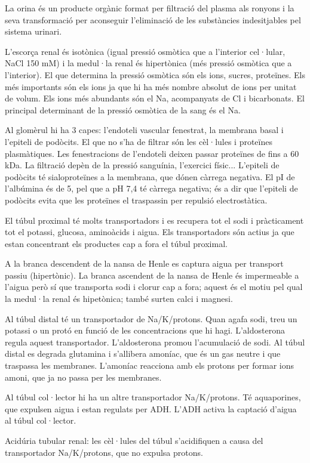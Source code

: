 La orina és un producte orgànic format per filtració del plasma als ronyons i la seva transformació per aconseguir l'eliminació de les substàncies indesitjables pel sistema urinari.


L'escorça renal és isotònica (igual pressió osmòtica que a l'interior cel·lular, NaCl 150 mM) i la medul·la renal és hipertònica (més pressió osmòtica que a l'interior). El que determina la pressió osmòtica són els ions, sucres, proteïnes. Els més importants són els ions ja que hi ha més nombre absolut de ions per unitat de volum. Els ions més abundants són el Na, acompanyats de Cl i bicarbonats. El principal determinant de la pressió osmòtica de la sang és el Na.

Al glomèrul hi ha 3 capes: l'endoteli vascular fenestrat, la membrana basal i l'epiteli de podòcits. El que no s'ha de filtrar són les cèl·lules i proteïnes plasmàtiques. Les fenestracions de l'endoteli deixen passar proteïnes de fins a 60 kDa. La filtració depèn de la pressió sanguínia, l'exercici físic... L'epiteli de podòcits té sialoproteïnes a la membrana, que dónen càrrega negativa. El pI de l'albúmina és de 5, pel que a pH 7,4 té càrrega negativa; és a dir que l'epiteli de podòcits evita que les proteïnes el traspassin per repulsió electrostàtica.

El túbul proximal té molts transportadors i es recupera tot el sodi i pràcticament tot el potassi, glucosa, aminoàcids i aigua. Els transportadors són actius ja que estan concentrant els productes cap a fora el túbul proximal. 

A la branca descendent de la nansa de Henle es captura aigua per transport passiu (hipertònic). La branca ascendent de la nansa de Henle és impermeable a l'aigua però sí que transporta sodi i clorur cap a fora; aquest és el motiu pel qual la medul·la renal és hipetònica; també surten calci i magnesi.

Al túbul distal té un transportador de Na/K/protons. Quan agafa sodi, treu un potassi o un protó en funció de les concentracions que hi hagi. L'aldosterona regula aquest transportador. L'aldosterona promou l'acumulació de sodi. Al túbul distal es degrada glutamina i s'allibera amoníac, que és un gas neutre i que traspassa les membranes. L'amoníac reacciona amb els protons per formar ions amoni, que ja no passa per les membranes.

Al túbul col·lector hi ha un altre transportador Na/K/protons. Té aquaporines, que expulsen aigua i estan regulats per ADH. L'ADH activa la captació d'aigua al túbul col·lector.


Acidúria tubular renal: les cèl·lules del túbul s'acidifiquen a causa del transportador Na/K/protons, que no expulsa protons.